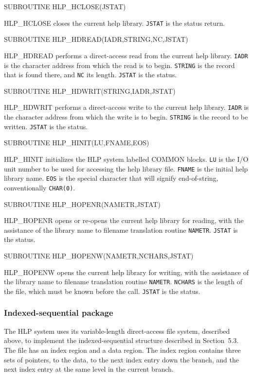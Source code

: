 \documentclass[11pt,nolof]{starlink}
\begin{document}
\begin{terminalv}
SUBROUTINE HLP_HCLOSE(JSTAT)
\end{terminalv}
HLP\_HCLOSE closes the current help library.  \texttt{JSTAT} is the
status return.

\begin{terminalv}
SUBROUTINE HLP_HDREAD(IADR,STRING,NC,JSTAT)
\end{terminalv}
HLP\_HDREAD performs a direct-access read from the current help library.
\texttt{IADR} is the character address from which the read is to
begin.  \texttt{STRING} is the record that is found there, and
\texttt{NC} its length.  \texttt{JSTAT} is the status.

\begin{terminalv}
SUBROUTINE HLP_HDWRIT(STRING,IADR,JSTAT)
\end{terminalv}
HLP\_HDWRIT performs a direct-access write to the current help library.
\texttt{IADR} is the character address from which the write is to begin.
\texttt{STRING} is the record to be written.  \texttt{JSTAT} is the status.

\begin{terminalv}
SUBROUTINE HLP_HINIT(LU,FNAME,EOS)
\end{terminalv}
HLP\_HINIT initializes the HLP system labelled COMMON blocks.
\texttt{LU} is the I/O unit number to be used for accessing the
help library file.  \texttt{FNAME} is the initial help library name.
\texttt{EOS} is the special character that will signify end-of-string,
conventionally \texttt{CHAR(0)}.

\begin{terminalv}
SUBROUTINE HLP_HOPENR(NAMETR,JSTAT)
\end{terminalv}
HLP\_HOPENR opens or re-opens the current help library for reading,
with the assistance of the library name to filename translation
routine \texttt{NAMETR}.
\texttt{JSTAT} is the status.

\begin{terminalv}
SUBROUTINE HLP_HOPENW(NAMETR,NCHARS,JSTAT)
\end{terminalv}
HLP\_HOPENW opens the current help library for writing,
with the assistance of the library name to filename translation
routine \texttt{NAMETR}.
\texttt{NCHARS}
is the length of the file, which must be known before the call.
\texttt{JSTAT} is the status.

\subsubsection{Indexed-sequential package}
The HLP system uses its variable-length direct-access file
system, described above,
to implement the indexed-sequential structure described
in Section~5.3.  The file has an index region and a
data region.  The index region contains three sets of pointers,
to the data, to the next index entry down the branch, and the
next index entry at the same level in the current branch.
\end{document}
